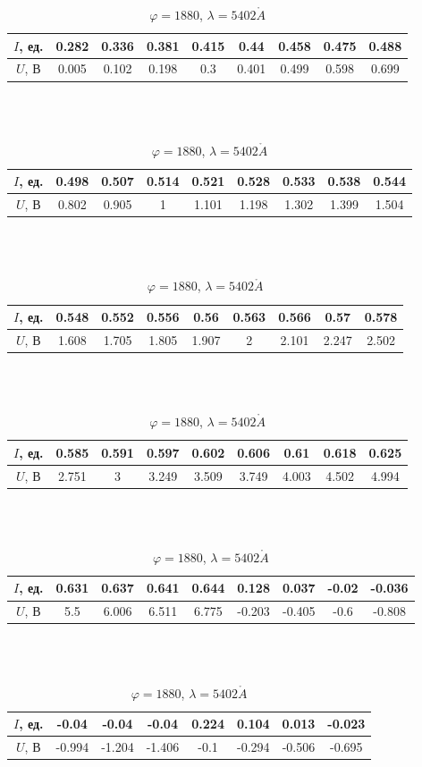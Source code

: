 \documentclass[a4paper, 12pt]{article}
\renewcommand{\phi}{\varphi}
\renewcommand{\AA}{\ensuremath{\mathring{A}}}
\begin{document}
\begin{table}[H]
    \centering
    \begin{tabular}{|c|c|c|c|c|c|c|c|c|}
        \hline
        $I$, ед. & 0.282 & 0.336 & 0.381 & 0.415 & 0.44 & 0.458 & 0.475 & 0.488\\ \hline
        $U$, В   & 0.005 & 0.102 & 0.198 & 0.3 & 0.401 & 0.499 & 0.598 & 0.699
        \\ \hline
    \end{tabular}
    \\~\\
    \begin{tabular}{|c|c|c|c|c|c|c|c|c|}
        \hline
        $I$, ед. & 0.498 & 0.507 & 0.514 & 0.521 & 0.528 & 0.533 & 0.538 & 0.544\\ \hline
        $U$, В   & 0.802 & 0.905 & 1 & 1.101 & 1.198 & 1.302 & 1.399 & 1.504
        \\ \hline
    \end{tabular}
    \\~\\
    \begin{tabular}{|c|c|c|c|c|c|c|c|c|}
        \hline
        $I$, ед. & 0.548 & 0.552 & 0.556 & 0.56 & 0.563 & 0.566 & 0.57 & 0.578\\ \hline
        $U$, В   & 1.608 & 1.705 & 1.805 & 1.907 & 2 & 2.101 & 2.247 & 2.502
        \\ \hline
    \end{tabular}
    \\~\\
    \begin{tabular}{|c|c|c|c|c|c|c|c|c|}
        \hline
        $I$, ед. & 0.585 & 0.591 & 0.597 & 0.602 & 0.606 & 0.61 & 0.618 & 0.625\\ \hline
        $U$, В   & 2.751 & 3 & 3.249 & 3.509 & 3.749 & 4.003 & 4.502 & 4.994
        \\ \hline
    \end{tabular}
    \\~\\
    \begin{tabular}{|c|c|c|c|c|c|c|c|c|}
        \hline
        $I$, ед. & 0.631 & 0.637 & 0.641 & 0.644 & 0.128 & 0.037 & -0.02 & -0.036\\ \hline
        $U$, В   & 5.5 & 6.006 & 6.511 & 6.775 & -0.203 & -0.405 & -0.6 & -0.808
        \\ \hline
    \end{tabular}
    \\~\\
    \begin{tabular}{|c|c|c|c|c|c|c|c|}
        \hline
        $I$, ед. & -0.04 & -0.04 & -0.04 & 0.224 & 0.104 & 0.013 & -0.023\\ \hline
        $U$, В   & -0.994 & -1.204 & -1.406 & -0.1 & -0.294 & -0.506 & -0.695
        \\ \hline
    \end{tabular}
    \caption {$\phi = 1880$, $\lambda = 5402 \AA$}
\end{table}
\end{document}
